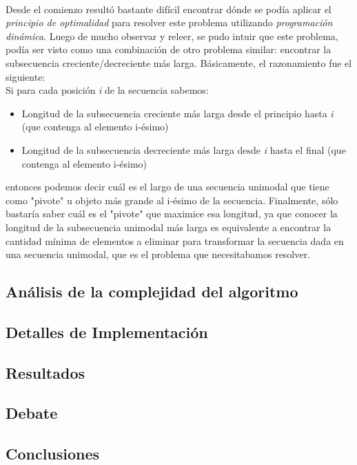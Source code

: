 \paragraph{}
Desde el comienzo resultó bastante difícil encontrar dónde se podía aplicar el \textit{principio de optimalidad} para resolver este problema utilizando \textit{programación dinámica}. Luego de mucho observar y releer, se pudo intuir que este problema, podía ser visto como una combinación de otro problema similar: encontrar la subsecuencia creciente/decreciente más larga. Básicamente, el razonamiento fue el siguiente:\\
Si para cada posición \textit{i} de la secuencia sabemos:
\begin{itemize}
	\item Longitud de la subsecuencia creciente más larga desde el principio hasta \textit{i} (que contenga al elemento i-ésimo)
	\item Longitud de la subsecuencia decreciente más larga desde \textit{i} hasta el final (que contenga al elemento i-ésimo)
\end{itemize}
entonces podemos decir cuál es el largo de una secuencia unimodal que tiene como "pivote" u objeto más grande al i-ésimo de la secuencia. Finalmente, sólo bastaría saber cuál es el "pivote" que maximice esa longitud, ya que conocer la longitud de la subsecuencia unimodal más larga es equivalente a encontrar la cantidad mínima de elementos a eliminar para transformar la secuencia dada en una secuencia unimodal, que es el problema que necesitabamos resolver.

\paragraph{}


\subsection{Análisis de la complejidad del algoritmo}
\subsection{Detalles de Implementación}
\subsection{Resultados}
\label{Resultados1}
\subsection{Debate}
\subsection{Conclusiones}

